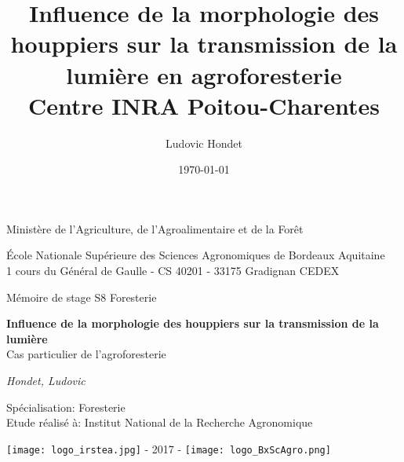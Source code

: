 \documentclass[12pt]{report}
\title{Influence de la morphologie des houppiers sur la transmission de la
  lumière en agroforesterie\\
\normalsize{Centre INRA Poitou-Charentes}}
\author{Ludovic Hondet}
\date{\today}
\begin{document}
\begin{titlepage}    
    \centering
    {\normalsize Ministère de l'Agriculture, de l'Agroalimentaire et de la Forêt \par}
    \vspace{17.28pt}
    {{\LARGE École Nationale Supérieure des Sciences
    Agronomiques de Bordeaux Aquitaine}\\
    {\normalsize 1 cours du Général de Gaulle - CS 40201 - 33175 Gradignan CEDEX} \par}
    \vspace{17.28pt}
    {\LARGE Mémoire de stage S8 Foresterie \par}
    \vspace{34.56pt}
    {\LARGE \textbf{Influence de la morphologie des houppiers sur la transmission de la lumière}\\
    Cas particulier de l'agroforesterie \par}
    
    \vfill

    {\large \textit{Hondet, Ludovic} \par}
    \begin{flushleft}
      {\large Spécialisation: Foresterie\\
      Etude réalisé à: Institut National de la Recherche Agronomique \par}
    \end{flushleft}
    \vspace{5mm}
    {\texttt{[image: logo\_irstea.jpg]} \hfill \LARGE{- 2017 -} \hfill \texttt{[image: logo\_BxScAgro.png]}}
\end{titlepage}

\newpage
\thispagestyle{empty}
~
\newpage


\restoregeometry
\maketitle
\newpage
\thispagestyle{empty}
~
\newpage
{}

\end{document}
